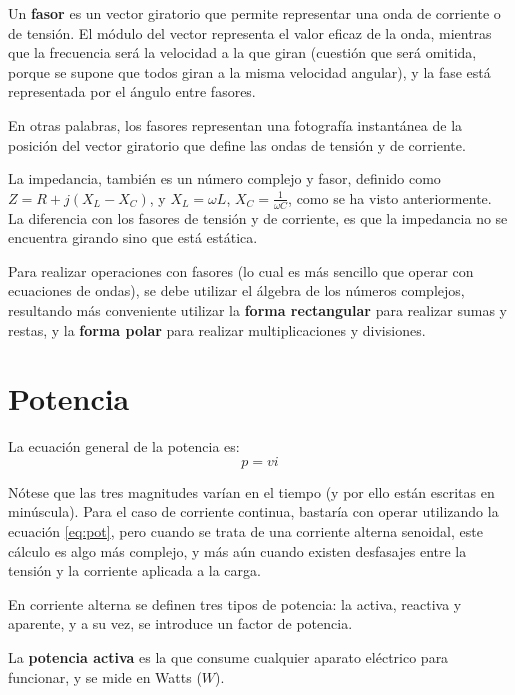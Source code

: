 
Un \textbf{fasor} es un vector giratorio que permite representar una onda de corriente o de tensión. El módulo del vector representa el valor eficaz de la onda, mientras que la frecuencia será la velocidad a la que giran (cuestión que será omitida, porque se supone que todos giran a la misma velocidad angular), y la fase está representada por el ángulo entre fasores.

En otras palabras, los fasores representan una fotografía instantánea de la posición del vector giratorio que define las ondas de tensión y de corriente.

La impedancia, también es un número complejo y fasor, definido como $Z= R+j(X_L - X_C)$, y $X_L = \omega L $, $X_C = \frac{1}{\omega C}$, como se ha visto anteriormente. La diferencia con los fasores de tensión y de corriente, es que la impedancia no se encuentra girando sino que está estática.

Para realizar operaciones con fasores (lo cual es más sencillo que operar con ecuaciones de ondas), se debe utilizar el álgebra de los números complejos, resultando más conveniente utilizar la \textbf{forma rectangular} para realizar sumas y restas, y la \textbf{forma polar} para realizar multiplicaciones y divisiones.

\section{Potencia}

La ecuación general de la potencia es: $$ p = vi $$

Nótese que las tres magnitudes varían en el tiempo (y por ello están escritas en minúscula). Para el caso de corriente continua, bastaría con operar utilizando la ecuación  \ref{eq:pot}, pero cuando se trata de una corriente alterna senoidal, este cálculo es algo más complejo, y más aún cuando existen desfasajes entre la tensión y la corriente aplicada a la carga.

En corriente alterna se definen tres tipos de potencia: la activa, reactiva y aparente, y a su vez, se introduce un factor de potencia.

La \textbf{potencia activa} es la que consume cualquier aparato eléctrico para funcionar, y se mide en Watts ($W$).

